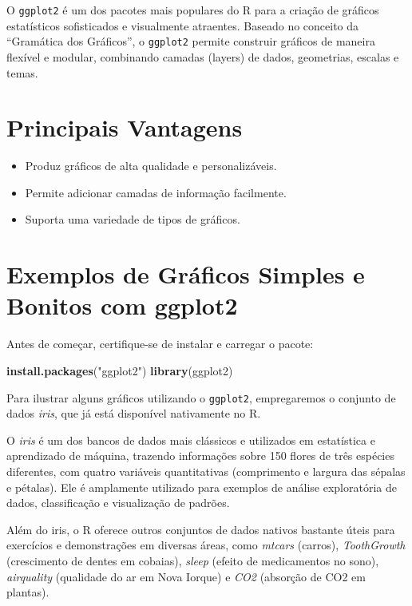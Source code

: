 \documentclass[
]{book}
\newenvironment{Shaded}{\begin{snugshade}}{\end{snugshade}}
\newcommand{\FunctionTok}[1]{\textcolor[rgb]{0.13,0.29,0.53}{\textbf{#1}}}
\newcommand{\NormalTok}[1]{#1}
\newcommand{\StringTok}[1]{\textcolor[rgb]{0.31,0.60,0.02}{#1}}
\providecommand{\tightlist}{%
  \setlength{\itemsep}{0pt}\setlength{\parskip}{0pt}}
\begin{document}
O \texttt{ggplot2} é um dos pacotes mais populares do R para a criação de gráficos estatísticos sofisticados e visualmente atraentes. Baseado no conceito da ``Gramática dos Gráficos'', o \texttt{ggplot2} permite construir gráficos de maneira flexível e modular, combinando camadas (layers) de dados, geometrias, escalas e temas.

\section{Principais Vantagens}\label{principais-vantagens}

\begin{itemize}
\tightlist
\item
  Produz gráficos de alta qualidade e personalizáveis.
\item
  Permite adicionar camadas de informação facilmente.
\item
  Suporta uma variedade de tipos de gráficos.
\end{itemize}

\section{Exemplos de Gráficos Simples e Bonitos com ggplot2}\label{exemplos-de-gruxe1ficos-simples-e-bonitos-com-ggplot2}

Antes de começar, certifique-se de instalar e carregar o pacote:

\begin{Shaded}
\begin{Highlighting}[]
\FunctionTok{install.packages}\NormalTok{(}\StringTok{"ggplot2"}\NormalTok{)}
\FunctionTok{library}\NormalTok{(ggplot2)}
\end{Highlighting}
\end{Shaded}

Para ilustrar alguns gráficos utilizando o \texttt{ggplot2}, empregaremos o conjunto de dados \emph{iris}, que já está disponível nativamente no R.

O \emph{iris} é um dos bancos de dados mais clássicos e utilizados em estatística e aprendizado de máquina, trazendo informações sobre 150 flores de três espécies diferentes, com quatro variáveis quantitativas (comprimento e largura das sépalas e pétalas). Ele é amplamente utilizado para exemplos de análise exploratória de dados, classificação e visualização de padrões.

Além do iris, o R oferece outros conjuntos de dados nativos bastante úteis para exercícios e demonstrações em diversas áreas, como \emph{mtcars} (carros), \emph{ToothGrowth} (crescimento de dentes em cobaias), \emph{sleep} (efeito de medicamentos no sono), \emph{airquality} (qualidade do ar em Nova Iorque) e \emph{CO2} (absorção de CO2 em plantas).
\end{document}
